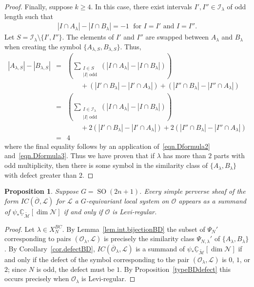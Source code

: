 \documentclass[reqno,11pt]{amsart}
\newtheorem{Prop}[Thm]{Proposition}
\theoremstyle{remark}
\theoremstyle{remark}
\theoremstyle{definition}
\theoremstyle{definition}
\theoremstyle{definition}
\numberwithin{equation}{section}
\newcommand{\C}{\mathbb{C}}           %
\newcommand{\SO}{\operatorname{SO}}
\newcommand{\ci}{\mathcal{I}}
\newcommand{\cl}{\mathcal{L}}
\newcommand{\cm}{\mathcal{M}}
\newcommand{\cn}{\mathcal{N}}
\newcommand{\co}{\mathcal{O}}
\newcommand{\shc}{\underline{\C}}
\renewcommand{\tilde}{\widetilde}
\begin{document}
\begin{proof}
Finally, suppose $k\geq 4$. In this case, there exist intervals $I',I'' \in \ci_\lambda$ of odd length such that 
\begin{eqnarray}\label{eqn.Dformula3}
|I\cap A_\lambda| - |I\cap B_\lambda| = -1 \; \text{ for $I=I'$ and $I=I''$}.
\end{eqnarray}
Let $S=\ci_\lambda \setminus \{I',I''\}$. The elements of $I'$ and $I''$ are swapped between $A_\lambda$ and $B_\lambda$ when creating the symbol $\{A_{\lambda, S} , B_{\lambda, S} \}$. Thus, 
\begin{eqnarray*}
|A_{\lambda, S}| - |B_{\lambda, S}| &=& \left( \sum_{\substack{I\in S\\ |I|\text{ odd}}} (|I\cap A_\lambda| - |I\cap B_\lambda|) \right) \\
&& \quad\quad + \left( |I'\cap B_\lambda| - |I'\cap A_\lambda| \right) + \left( |I''\cap B_\lambda|-|I''\cap A_\lambda| \right) \\
&=& \left( \sum_{\substack{I\in \ci_\lambda\\ |I|\text{ odd}}} (|I\cap A_\lambda| - |I\cap B_\lambda|) \right) \\
&& \quad\quad + 2\left( |I'\cap B_\lambda| - |I'\cap A_\lambda| \right) + 2\left( |I''\cap B_\lambda|-|I''\cap A_\lambda| \right) \\
&=& 4
\end{eqnarray*}
where the final equality follows by an application of~\eqref{eqn.Dformula2} and~\eqref{eqn.Dformula3}. Thus we have proven that if $\lambda$ has more than $2$ parts with odd multiplicity, then there is some symbol in the similarity class of $\{A_\lambda, B_\lambda\}$ with defect greater than $2$.
\end{proof}


\begin{Prop}\label{prop.orthogonal.odd} Suppose $G=\SO(2n+1)$. Every simple perverse sheaf of the form $IC(\overline{\co}, \cl)$  for $\cl$ a $G$-equivariant local system on $\co$ appears as a summand of $\psi_*\shc_{\tilde{\cm}}[\dim \cn]$ if and only if $\co$ is Levi-regular.
\end{Prop}

\begin{proof}
Let $\lambda\in X_{N}^{BC}$.   By Lemma~\ref{lem.int.bijectionBD} the subset of $\Psi_{N}'$ corresponding to pairs $(\co_\lambda, \cl)$ is precisely the similarity class $\Psi_{N,\lambda}'$ of $\{A_\lambda, B_\lambda\}$. 
By Corollary~\ref{cor.defectBD}, $IC(\overline{\co}_\lambda, \cl)$ is a summand of $\psi_*\shc_{\tilde{\cm}}[\dim \cn]$ if and only if the defect of the symbol corresponding to the pair $(\co_\lambda, \cl)$ is $0$, $1$, or $2$; since $N$ is odd, the defect must be $1$. 
By Proposition~\ref{typeBDdefect} this occurs precisely when  $\co_\lambda$ is Levi-regular.
\end{proof}
\end{document}
